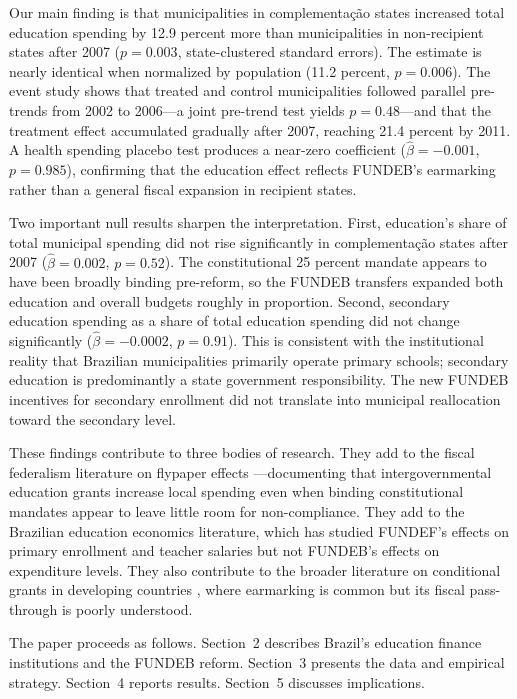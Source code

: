 \documentclass[12pt]{article}
\begin{document}
Our main finding is that municipalities in complementa\c{c}\~ao states increased total
education spending by 12.9 percent more than municipalities in non-recipient states
after 2007 ($p = 0.003$, state-clustered standard errors). The estimate is nearly
identical when normalized by population (11.2 percent, $p = 0.006$). The event study
shows that treated and control municipalities followed parallel pre-trends from 2002
to 2006---a joint pre-trend test yields $p = 0.48$---and that the treatment effect
accumulated gradually after 2007, reaching 21.4 percent by 2011. A health spending
placebo test produces a near-zero coefficient ($\hat{\beta} = -0.001$, $p = 0.985$),
confirming that the education effect reflects FUNDEB's earmarking rather than a
general fiscal expansion in recipient states.

Two important null results sharpen the interpretation. First, education's share of
total municipal spending did not rise significantly in complementa\c{c}\~ao states
after 2007 ($\hat{\beta} = 0.002$, $p = 0.52$). The constitutional 25 percent mandate
appears to have been broadly binding pre-reform, so the FUNDEB transfers expanded both
education and overall budgets roughly in proportion. Second, secondary education spending
as a share of total education spending did not change significantly
($\hat{\beta} = -0.0002$, $p = 0.91$). This is consistent with the institutional reality
that Brazilian municipalities primarily operate primary schools; secondary education
is predominantly a state government responsibility. The new FUNDEB incentives for
secondary enrollment did not translate into municipal reallocation toward the
secondary level.

These findings contribute to three bodies of research. They add to the fiscal federalism
literature on flypaper effects \citep{hines1995, bailey1998, inman2008}---documenting
that intergovernmental education grants increase local spending even when binding
constitutional mandates appear to leave little room for non-compliance. They add to the
Brazilian education economics literature, which has studied FUNDEF's effects on primary
enrollment and teacher salaries \citep{ferraz2012, dinarte2021} but not FUNDEB's effects
on expenditure levels. They also contribute to the broader literature on conditional
grants in developing countries \citep{alderman2007, benhassine2015}, where earmarking
is common but its fiscal pass-through is poorly understood.

The paper proceeds as follows. Section~2 describes Brazil's education finance
institutions and the FUNDEB reform. Section~3 presents the data and empirical strategy.
Section~4 reports results. Section~5 discusses implications.
\end{document}
